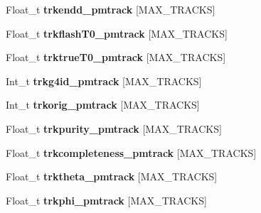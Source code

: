 \begin{DoxyCompactItemize}
\item 
\hypertarget{classanatree_aeb2777b215ef5c6e3e51202f86773745}{Float\-\_\-t {\bfseries trkendd\-\_\-pmtrack} \mbox{[}M\-A\-X\-\_\-\-T\-R\-A\-C\-K\-S\mbox{]}}\label{classanatree_aeb2777b215ef5c6e3e51202f86773745}

\item 
\hypertarget{classanatree_adb2e61caf54e6fc678b1869ee2226512}{Float\-\_\-t {\bfseries trkflash\-T0\-\_\-pmtrack} \mbox{[}M\-A\-X\-\_\-\-T\-R\-A\-C\-K\-S\mbox{]}}\label{classanatree_adb2e61caf54e6fc678b1869ee2226512}

\item 
\hypertarget{classanatree_ac1e686b8606161c5b72b189552df5b2a}{Float\-\_\-t {\bfseries trktrue\-T0\-\_\-pmtrack} \mbox{[}M\-A\-X\-\_\-\-T\-R\-A\-C\-K\-S\mbox{]}}\label{classanatree_ac1e686b8606161c5b72b189552df5b2a}

\item 
\hypertarget{classanatree_a389a142b574ea74f61e2247ff9ea9806}{Int\-\_\-t {\bfseries trkg4id\-\_\-pmtrack} \mbox{[}M\-A\-X\-\_\-\-T\-R\-A\-C\-K\-S\mbox{]}}\label{classanatree_a389a142b574ea74f61e2247ff9ea9806}

\item 
\hypertarget{classanatree_a40b2e25b21a569c112d0515d4d4fbc85}{Int\-\_\-t {\bfseries trkorig\-\_\-pmtrack} \mbox{[}M\-A\-X\-\_\-\-T\-R\-A\-C\-K\-S\mbox{]}}\label{classanatree_a40b2e25b21a569c112d0515d4d4fbc85}

\item 
\hypertarget{classanatree_a7c787dca7ecc8e5dc25a09f4b84cc6ed}{Float\-\_\-t {\bfseries trkpurity\-\_\-pmtrack} \mbox{[}M\-A\-X\-\_\-\-T\-R\-A\-C\-K\-S\mbox{]}}\label{classanatree_a7c787dca7ecc8e5dc25a09f4b84cc6ed}

\item 
\hypertarget{classanatree_a904eca4d622f71d436025a3783d9a780}{Float\-\_\-t {\bfseries trkcompleteness\-\_\-pmtrack} \mbox{[}M\-A\-X\-\_\-\-T\-R\-A\-C\-K\-S\mbox{]}}\label{classanatree_a904eca4d622f71d436025a3783d9a780}

\item 
\hypertarget{classanatree_a76982f5992329f79813fa15ea620fb03}{Float\-\_\-t {\bfseries trktheta\-\_\-pmtrack} \mbox{[}M\-A\-X\-\_\-\-T\-R\-A\-C\-K\-S\mbox{]}}\label{classanatree_a76982f5992329f79813fa15ea620fb03}

\item 
\hypertarget{classanatree_a00019f5a4bc26a4853595fafa2964cc7}{Float\-\_\-t {\bfseries trkphi\-\_\-pmtrack} \mbox{[}M\-A\-X\-\_\-\-T\-R\-A\-C\-K\-S\mbox{]}}\label{classanatree_a00019f5a4bc26a4853595fafa2964cc7}


\end{DoxyCompactItemize}
